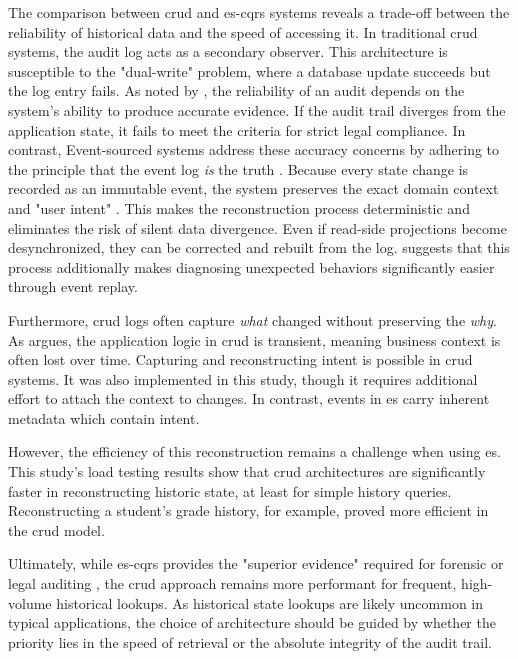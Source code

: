 The comparison between \gls{crud} and \gls{es}-\gls{cqrs} systems reveals a trade-off between the reliability of historical data and the speed of accessing it. In traditional \gls{crud} systems, the audit log acts as a secondary observer. This architecture is susceptible to the "dual-write" problem, where a database update succeeds but the log entry fails. As noted by \textcite[155]{gantz_basics_2014}, the reliability of an audit depends on the system's ability to produce accurate evidence. If the audit trail diverges from the application state, it fails to meet the criteria for strict legal compliance. In contrast, Event-sourced systems address these accuracy concerns by adhering to the principle that the event log \emph{is} the truth \cite{helland_immutability_2015}. Because every state change is recorded as an immutable event, the system preserves the exact domain context and "user intent" \cite[531]{kleppmann_designing_2017}. This makes the reconstruction process deterministic and eliminates the risk of silent data divergence. Even if read-side projections become desynchronized, they can be corrected and rebuilt from the log. \textcite{kleppmann_designing_2017} suggests that this process additionally makes diagnosing unexpected behaviors significantly easier through event replay.

Furthermore, \gls{crud} logs often capture \emph{what} changed without preserving the \emph{why}. As \textcite[531]{kleppmann_designing_2017} argues, the application logic in \gls{crud} is transient, meaning business context is often lost over time. Capturing and reconstructing intent is possible in \gls{crud} systems. It was also implemented in this study, though it requires additional effort to attach the context to changes. In contrast, events in \gls{es} carry inherent metadata which contain intent.

However, the efficiency of this reconstruction remains a challenge when using \acrlong{es}. This study's load testing results show that \gls{crud} architectures are significantly faster in reconstructing historic state, at least for simple history queries. Reconstructing a student's grade history, for example, proved more efficient in the \gls{crud} model.

Ultimately, while \gls{es}-\gls{cqrs} provides the "superior evidence" required for forensic or legal auditing \cite[17]{maier_audit_2006}, the \gls{crud} approach remains more performant for frequent, high-volume historical lookups. As historical state lookups are likely uncommon in typical applications, the choice of architecture should be guided by whether the priority lies in the speed of retrieval or the absolute integrity of the audit trail.

